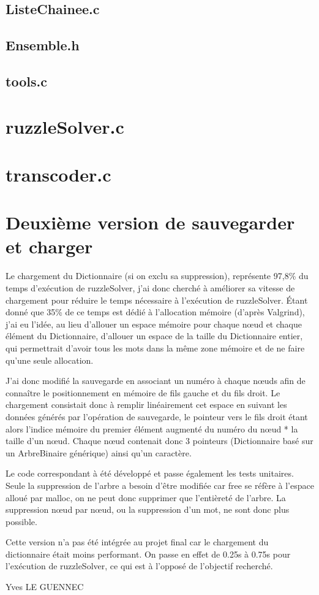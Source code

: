     \subsection{ListeChainee.c}
    \subsection{Ensemble.h}
    \subsection{tools.c}

  \section{ruzzleSolver.c}
  \section{transcoder.c}

\section{Deuxième version de sauvegarder et charger}
  Le chargement du Dictionnaire (si on exclu sa suppression), représente 97,8\%
  du temps d'exécution de ruzzleSolver, j'ai donc cherché à améliorer sa vitesse
  de chargement pour réduire le temps nécessaire à l'exécution de ruzzleSolver.
  Étant donné que 35\% de ce temps est dédié à l'allocation mémoire (d'après Valgrind),
  j'ai eu l'idée, au lieu d'allouer un espace mémoire pour chaque nœud et chaque
  élément du Dictionnaire, d'allouer un espace de la taille du Dictionnaire entier,
  qui permettrait d'avoir tous les mots dans la même zone mémoire et de ne faire qu'une
  seule allocation.
  
  J'ai donc modifié la sauvegarde en associant un numéro à chaque nœuds afin de connaître
  le positionnement en mémoire de fils gauche et du fils droit.
  Le chargement consistait donc à remplir linéairement cet espace en suivant les données
  générés par l'opération de sauvegarde, le pointeur vers le fils droit étant alors
  l'indice mémoire du premier élément augmenté du numéro du nœud * la taille d'un nœud.
  Chaque nœud contenait donc 3 pointeurs (Dictionnaire basé sur un ArbreBinaire générique)
  ainsi qu'un caractère.

  Le code correspondant à été développé et passe également les tests unitaires.
  Seule la suppression de l'arbre a besoin d'être modifiée car free se réfère à l'espace
  alloué par malloc, on ne peut donc supprimer que l'entièreté de l'arbre.
  La suppression nœud par nœud, ou la suppression d'un mot, ne sont donc plus possible.

  Cette version n'a pas été intégrée au projet final car le chargement du dictionnaire était moins performant. On passe en effet de 0.25s à 0.75s pour l'exécution de ruzzleSolver, ce qui
  est à l'opposé de l'objectif recherché.

  Yves LE GUENNEC
